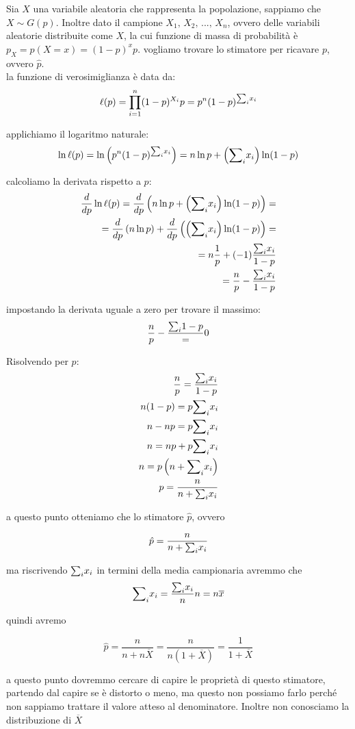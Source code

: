 \begin{esempio}
Sia $X$ una variabile aleatoria che rappresenta la popolazione, sappiamo che $X\sim G(p)$. Inoltre dato il campione $X_1,\, X_2,\, ...,\, X_n$, ovvero delle variabili aleatorie distribuite come $X$, la cui funzione di massa di probabilità è $p_X = p(X = x) = (1-p)^{x}p$.
vogliamo trovare lo stimatore per ricavare $p$, ovvero $\hat{p}$. \\

\noindent la funzione di verosimiglianza è data da:
\[
\ell(p) = \prod_{i=1}^n (1-p)^{X_i}p = p^n (1 - p)^{{\sum}_i x_i}
\]

\noindent applichiamo il logaritmo naturale:
\[
\ln \ell(p) = \ln \left( p^n (1 - p)^{{\sum}_i x_i} \right) = n \ln p + \left( {\sum}_i x_i \right) \ln (1 - p)
\]

\noindent calcoliamo la derivata rispetto a \( p \):
\begin{align*}
    \frac{d}{dp} \ln \ell(p) = \frac{d}{dp} \left( n \ln p + \left( {\sum}_i x_i \right) \ln (1 - p) \right) = \\
    = \frac{d}{dp} \left( n \ln p \right) + \frac{d}{dp} \left( \left( {\sum}_i x_i \right) \ln (1 - p) \right) = \\
    = n \frac{1}{p} + (-1) \frac{{\sum}_i x_i}{1 - p} \\
    = \frac{n}{p} - \frac{{\sum}_i x_i}{1 - p}
\end{align*}

\noindent impostando la derivata uguale a zero per trovare il massimo:
\[
\frac{n}{p} - \frac{{\sum}_i 1 - p} = 0
\]

Risolvendo per \( p \):
\begin{align*}
    \frac{n}{p} = \frac{{\sum}_i x_i}{1 - p} \\
    n (1 - p) = p {\sum}_i x_i \\
    n - np = p {\sum}_i x_i \\
    n = np + p {\sum}_i x_i \\
    n = p \left( n + {\sum}_i x_i \right) \\
    p = \frac{n}{n + {\sum}_i x_i}
\end{align*}

\noindent a questo punto otteniamo che lo stimatore $\hat{p}$, ovvero

$$\hat{p} = \frac{n}{n + {\sum}_i x_i}$$

\noindent ma riscrivendo ${\sum}_i x_i$ in termini della media campionaria avremmo che 
$$ {\sum}_i x_i = \frac{{\sum}_i x_i}{n} n = n\overline{x}$$

\noindent quindi avremo

$$\hat{p} = \frac{n}{n + n\overline{X}} = \frac{n}{n(1 + \overline{X})} = \frac{1}{1 + \overline{X}}$$

\noindent a questo punto dovremmo cercare di capire le proprietà di questo stimatore, partendo dal capire se è distorto o meno, ma questo non possiamo farlo perché non sappiamo trattare il valore atteso al denominatore. Inoltre non conosciamo la distribuzione di $\overline{X}$
\end{esempio}

